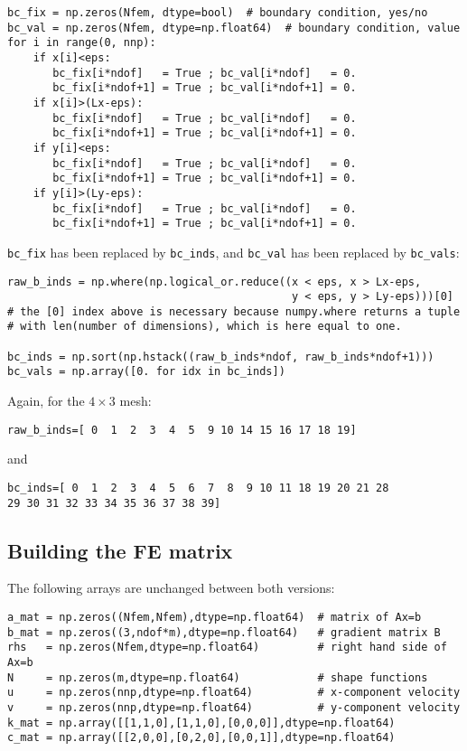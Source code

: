 \begin{lstlisting}
bc_fix = np.zeros(Nfem, dtype=bool)  # boundary condition, yes/no
bc_val = np.zeros(Nfem, dtype=np.float64)  # boundary condition, value
for i in range(0, nnp):
    if x[i]<eps:
       bc_fix[i*ndof]   = True ; bc_val[i*ndof]   = 0.
       bc_fix[i*ndof+1] = True ; bc_val[i*ndof+1] = 0.
    if x[i]>(Lx-eps):
       bc_fix[i*ndof]   = True ; bc_val[i*ndof]   = 0.
       bc_fix[i*ndof+1] = True ; bc_val[i*ndof+1] = 0.
    if y[i]<eps:
       bc_fix[i*ndof]   = True ; bc_val[i*ndof]   = 0.
       bc_fix[i*ndof+1] = True ; bc_val[i*ndof+1] = 0.
    if y[i]>(Ly-eps):
       bc_fix[i*ndof]   = True ; bc_val[i*ndof]   = 0.
       bc_fix[i*ndof+1] = True ; bc_val[i*ndof+1] = 0.
\end{lstlisting}


\lstinline{bc_fix} has been replaced by \lstinline{bc_inds}, and 
\lstinline{bc_val} has been replaced by \lstinline{bc_vals}:

\begin{lstlisting}
raw_b_inds = np.where(np.logical_or.reduce((x < eps, x > Lx-eps,
                                            y < eps, y > Ly-eps)))[0]
# the [0] index above is necessary because numpy.where returns a tuple
# with len(number of dimensions), which is here equal to one.

bc_inds = np.sort(np.hstack((raw_b_inds*ndof, raw_b_inds*ndof+1)))
bc_vals = np.array([0. for idx in bc_inds])
\end{lstlisting}

Again, for the $4\times 3$ mesh:
\begin{verbatim}
raw_b_inds=[ 0  1  2  3  4  5  9 10 14 15 16 17 18 19]
\end{verbatim}
and 
\begin{verbatim}
bc_inds=[ 0  1  2  3  4  5  6  7  8  9 10 11 18 19 20 21 28 
29 30 31 32 33 34 35 36 37 38 39]
\end{verbatim}

\subsection*{Building the FE matrix}

The following arrays are unchanged between both versions:

\begin{lstlisting}
a_mat = np.zeros((Nfem,Nfem),dtype=np.float64)  # matrix of Ax=b
b_mat = np.zeros((3,ndof*m),dtype=np.float64)   # gradient matrix B 
rhs   = np.zeros(Nfem,dtype=np.float64)         # right hand side of Ax=b
N     = np.zeros(m,dtype=np.float64)            # shape functions
u     = np.zeros(nnp,dtype=np.float64)          # x-component velocity
v     = np.zeros(nnp,dtype=np.float64)          # y-component velocity
k_mat = np.array([[1,1,0],[1,1,0],[0,0,0]],dtype=np.float64) 
c_mat = np.array([[2,0,0],[0,2,0],[0,0,1]],dtype=np.float64) 
\end{lstlisting}

